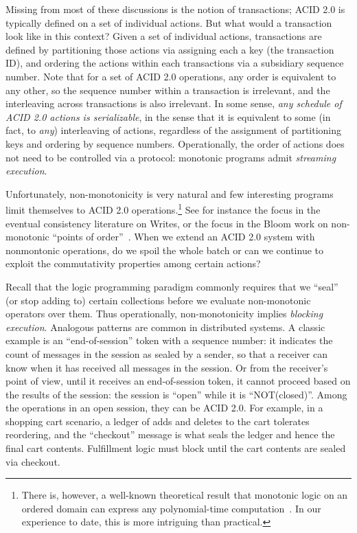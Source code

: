 \documentclass{sig-alternate}
\begin{document}
Missing from most of these discussions is the notion of transactions; ACID 2.0
is typically defined on a set of individual actions.  But what would a
transaction look like in this context?  Given a set of individual actions,
transactions are defined by partitioning those actions via assigning each a key
(the transaction ID), and ordering the actions within each transactions via a
subsidiary sequence number.  Note that for a set of ACID 2.0 operations, any
order is equivalent to any other, so the sequence number within a transaction is
irrelevant, and the interleaving across transactions is also irrelevant.  In
some sense, \emph{any schedule of ACID 2.0 actions is serializable}, in the
sense that it is equivalent to some (in fact, to \emph{any}) interleaving of
actions, regardless of the assignment of partitioning keys and ordering by
sequence numbers.  Operationally, the order of actions does not need to be
controlled via a protocol: monotonic programs admit \emph{streaming execution}.

Unfortunately, non-monotonicity is very natural and few interesting programs
limit themselves to ACID 2.0 operations.\footnote{There is, however, a
  well-known theoretical result that monotonic logic on an ordered domain can express
  any polynomial-time computation~\cite{immerman-ptime}.  In our experience to
  date, this is more intriguing than practical.}  See for instance the focus in
the eventual consistency literature on Writes, or the focus in the Bloom work on
non-monotonic ``points of order''~\cite{Alvaro2011}.
When we extend an ACID 2.0 system with nonmontonic operations, do we spoil the whole batch
or can we continue to exploit the commutativity properties among certain actions?


Recall that the logic programming paradigm commonly requires that we
``seal'' (or stop adding to) certain collections before we evaluate non-monotonic operators
over them.
Thus operationally, non-monotonicity implies \emph{blocking execution}. 
Analogous patterns are common in distributed systems.
A classic example
is an ``end-of-session'' token with a sequence number: it indicates the count of
messages in the session as sealed by a sender, so that a receiver can know when
it has received all messages in the session.  Or from the receiver's point of
view, until it receives an end-of-session token, it cannot proceed based on the
results of the session: the session is ``open'' while it is ``NOT(closed)''.
Among the operations in an open session, they can be ACID 2.0.  For example, in
a shopping cart scenario, a ledger of adds and deletes to the cart tolerates
reordering, and the ``checkout'' message is what seals the ledger and hence the
final cart contents.  Fulfillment logic must block until the cart contents are
sealed via checkout.
\end{document}

